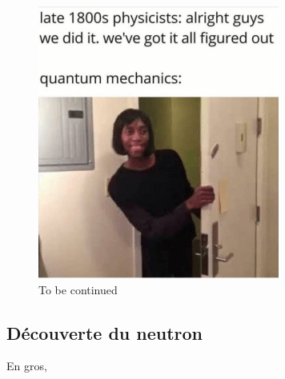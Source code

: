      \begin{figure}[ht]
        \centering
        \includegraphics[scale=0.60]{Images1/mama.png}
        \caption{To be continued}
    \end{figure}

    \subsection{Découverte du neutron}
    
    En gros, 
    
